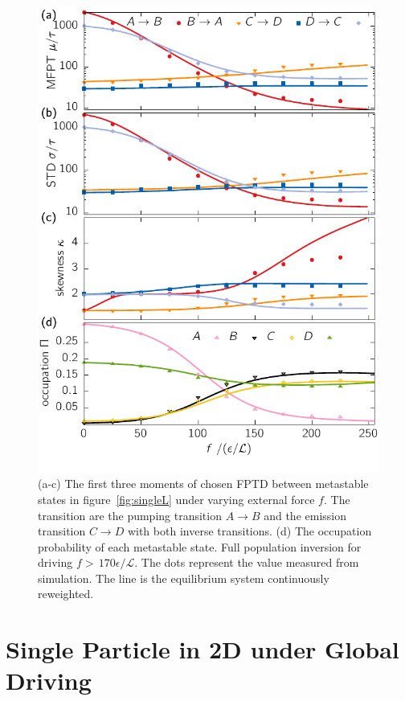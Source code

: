 \begin{figure}
\centering
 \includegraphics{../plots/Urew/mom_9040.pdf}
 \caption[The first three moments and the population of metastable states for the laser system for varying external force.]{(a-c) The first three moments of chosen FPTD between metastable states in figure~\ref{fig:singleL} under varying external force $f$. The transition are the pumping transition $A \rightarrow B$ and the emission transition $C \rightarrow D$ with both inverse transitions. (d) The occupation probability of each metastable state. Full population inversion for driving $f >\,170 \epsilon / \mathcal{L}$.  The dots represent the value measured from simulation. The line is the equilibrium system continuously reweighted. }
 \label{fig:momL}
\end{figure}
\FloatBarrier

\section{Single Particle in 2D under Global Driving} 
\label{sec:2Dsys}

